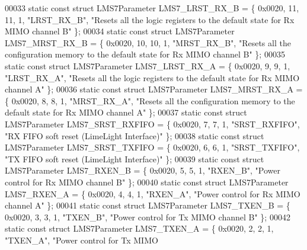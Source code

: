 \begin{DoxyCode}
00033 \textcolor{keyword}{static} \textcolor{keyword}{const} \textcolor{keyword}{struct }LMS7Parameter LMS7_LRST_RX_B = \{ 0x0020, 11, 11, 1, \textcolor{stringliteral}{"LRST\_RX\_B"}, \textcolor{stringliteral}{"Resets all the logic
       registers to the default state for Rx MIMO channel B"} \};
00034 \textcolor{keyword}{static} \textcolor{keyword}{const} \textcolor{keyword}{struct }LMS7Parameter LMS7_MRST_RX_B = \{ 0x0020, 10, 10, 1, \textcolor{stringliteral}{"MRST\_RX\_B"}, \textcolor{stringliteral}{"Resets all the
       configuration memory to the default state for Rx MIMO channel B"} \};
00035 \textcolor{keyword}{static} \textcolor{keyword}{const} \textcolor{keyword}{struct }LMS7Parameter LMS7_LRST_RX_A = \{ 0x0020, 9, 9, 1, \textcolor{stringliteral}{"LRST\_RX\_A"}, \textcolor{stringliteral}{"Resets all the logic
       registers to the default state for Rx MIMO channel A"} \};
00036 \textcolor{keyword}{static} \textcolor{keyword}{const} \textcolor{keyword}{struct }LMS7Parameter LMS7_MRST_RX_A = \{ 0x0020, 8, 8, 1, \textcolor{stringliteral}{"MRST\_RX\_A"}, \textcolor{stringliteral}{"Resets all the
       configuration memory to the default state for Rx MIMO channel A"} \};
00037 \textcolor{keyword}{static} \textcolor{keyword}{const} \textcolor{keyword}{struct }LMS7Parameter LMS7_SRST_RXFIFO = \{ 0x0020, 7, 7, 1, \textcolor{stringliteral}{"SRST\_RXFIFO"}, \textcolor{stringliteral}{"RX FIFO soft reset
       (LimeLight Interface)"} \};
00038 \textcolor{keyword}{static} \textcolor{keyword}{const} \textcolor{keyword}{struct }LMS7Parameter LMS7_SRST_TXFIFO = \{ 0x0020, 6, 6, 1, \textcolor{stringliteral}{"SRST\_TXFIFO"}, \textcolor{stringliteral}{"TX FIFO soft reset
       (LimeLight Interface)"} \};
00039 \textcolor{keyword}{static} \textcolor{keyword}{const} \textcolor{keyword}{struct }LMS7Parameter LMS7_RXEN_B = \{ 0x0020, 5, 5, 1, \textcolor{stringliteral}{"RXEN\_B"}, \textcolor{stringliteral}{"Power control for Rx MIMO
       channel B"} \};
00040 \textcolor{keyword}{static} \textcolor{keyword}{const} \textcolor{keyword}{struct }LMS7Parameter LMS7_RXEN_A = \{ 0x0020, 4, 4, 1, \textcolor{stringliteral}{"RXEN\_A"}, \textcolor{stringliteral}{"Power control for Rx MIMO
       channel A"} \};
00041 \textcolor{keyword}{static} \textcolor{keyword}{const} \textcolor{keyword}{struct }LMS7Parameter LMS7_TXEN_B = \{ 0x0020, 3, 3, 1, \textcolor{stringliteral}{"TXEN\_B"}, \textcolor{stringliteral}{"Power control for Tx MIMO
       channel B"} \};
00042 \textcolor{keyword}{static} \textcolor{keyword}{const} \textcolor{keyword}{struct }LMS7Parameter LMS7_TXEN_A = \{ 0x0020, 2, 2, 1, \textcolor{stringliteral}{"TXEN\_A"}, \textcolor{stringliteral}{"Power control for Tx MIMO
}
\end{DoxyCode}
